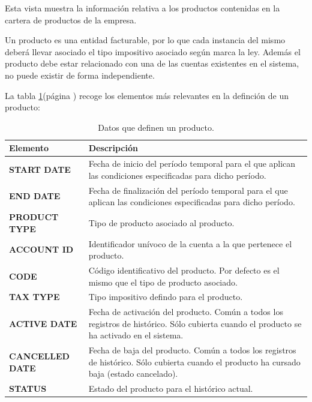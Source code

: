 Esta vista muestra la información relativa a los productos contenidas en la cartera de productos de la empresa.

Un producto es una entidad facturable, por lo que cada instancia del mismo deberá llevar asociado el tipo impositivo asociado según marca la ley. Además el producto debe estar relacionado con una de las cuentas existentes en el sistema, no puede existir de forma independiente.


La tabla \ref{tab:producto}(página \pageref{tab:producto}) recoge los elementos más relevantes en la definción de un producto:

\begin{table}[H]
  \centering
  \setlength{\leftmargini}{0.4cm}
  \resizebox{14cm}{!} {
  \begin{tabular}{|m{6cm} m{8cm}|}
  \rowcolor{udcpink!25}
  \hline
  	\textbf{Elemento} & \textbf{Descripción} \\\hline
  	\textbf{START DATE} & Fecha de inicio del período temporal para el que aplican las condiciones especificadas para dicho período.\\
  	\textbf{END DATE} & Fecha de finalización del período temporal para el que aplican las condiciones especificadas para dicho período.\\
	\textbf{PRODUCT TYPE} & Tipo de producto asociado al producto.\\
	\textbf{ACCOUNT ID} & Identificador unívoco de la cuenta a la que pertenece el producto.\\
	\textbf{CODE} & Código identificativo del producto. Por defecto es el mismo que el tipo de producto asociado.\\	
	\textbf{TAX TYPE} & Tipo impositivo defindo para el producto.\\
	\textbf{ACTIVE DATE} & Fecha de activación del producto. Común a todos los registros de histórico. Sólo cubierta cuando el producto se ha activado en el sistema.\\	
	\textbf{CANCELLED DATE} & Fecha de baja del producto. Común a todos los registros de histórico. Sólo cubierta cuando el producto ha cursado baja (estado cancelado).	\\
	\textbf{STATUS} & Estado del producto para el histórico actual.	
	\\\hline
  \end{tabular}
  } %
  \caption{Datos que definen un producto.}
  \label{tab:producto}
\end{table}



